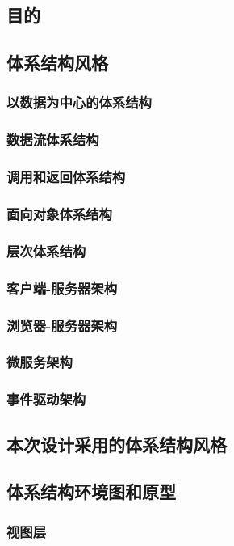 \documentclass[12pt]{ctexart} %
\begin{document}
\subsection{目的}
\subsection{体系结构风格}
\subsubsection{以数据为中心的体系结构}
\subsubsection{数据流体系结构}
\subsubsection{调用和返回体系结构}
\subsubsection{面向对象体系结构}
\subsubsection{层次体系结构}
\subsubsection{客户端-服务器架构}
\subsubsection{浏览器-服务器架构}
\subsubsection{微服务架构}
\subsubsection{事件驱动架构}
\subsection{本次设计采用的体系结构风格}
\subsection{体系结构环境图和原型}
\subsubsection{视图层}
\end{document}
